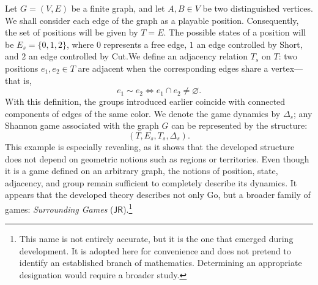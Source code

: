 	Let $G=(V,E)$ be a finite graph, and let $A,B\in V$ be two distinguished vertices. We shall consider each edge of the graph as a playable position. Consequently, the set of positions will be given by $T=E$. The possible states of a position will be $E_s=\{0,1,2\}$, where $0$ represents a free edge, $1$ an edge controlled by Short, and $2$ an edge controlled by Cut.We define an adjacency relation $T_s$ on $T$: two positions $e_1, e_2 \in T$ are adjacent when the corresponding edges share a vertex—that is,$$e_1\sim e_2 \iff e_1\cap e_2\neq\varnothing.$$With this definition, the groups introduced earlier coincide with connected components of edges of the same color. We denote the game dynamics by $\Delta_s$; any Shannon game associated with the graph $G$ can be represented by the structure:$$(T,E_s,T_s,\Delta_s).$$This example is especially revealing, as it shows that the developed structure does not depend on geometric notions such as regions or territories. Even though it is a game defined on an arbitrary graph, the notions of position, state, adjacency, and group remain sufficient to completely describe its dynamics. It appears that the developed theory describes not only Go, but a broader family of games: \emph{Surrounding Games} ($\mathsf{JR}$).\footnote{This name is not entirely accurate, but it is the one that emerged during development. It is adopted here for convenience and does not pretend to identify an established branch of mathematics. Determining an appropriate designation would require a broader study.}
